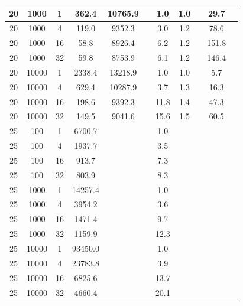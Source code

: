 \documentclass{juliacon}
\begin{document}
\begin{table}[!t]
{{\begin{tabular}{|c|c|c|c|c|c|c|c|c|c|c|}
    \hline
    20 & 1000 & 1 & 362.4 & 10765.9 &   & 1.0 & 1.0 &   & 29.7 &  \\
    \hline
    20 & 1000 & 4 & 119.0 & 9352.3 &   & 3.0 & 1.2 &   & 78.6 &  \\
    \hline
    20 & 1000 & 16 & 58.8 & 8926.4 &   & 6.2 & 1.2 &   & 151.8 &  \\
    \hline
    20 & 1000 & 32 & 59.8 & 8753.9 &   & 6.1 & 1.2 &   & 146.4 &  \\
    \hline
    20 & 10000 & 1 & 2338.4 & 13218.9 &   & 1.0 & 1.0 &   & 5.7 &  \\
    \hline
    20 & 10000 & 4 & 629.4 & 10287.9 &   & 3.7 & 1.3 &   & 16.3 &  \\
    \hline
    20 & 10000 & 16 & 198.6 & 9392.3 &   & 11.8 & 1.4 &   & 47.3 &  \\
    \hline
    20 & 10000 & 32 & 149.5 & 9041.6 &   & 15.6 & 1.5 &   & 60.5 &  \\
    \hline
    25 & 100 & 1 & 6700.7 &   &   & 1.0 &   &   &   &  \\
    \hline
    25 & 100 & 4 & 1937.7 &   &   & 3.5 &   &   &   &  \\
    \hline
    25 & 100 & 16 & 913.7 &   &   & 7.3 &   &   &   &  \\
    \hline
    25 & 100 & 32 & 803.9 &   &   & 8.3 &   &   &   &  \\
    \hline
    25 & 1000 & 1 & 14257.4 &   &   & 1.0 &   &   &   &  \\
    \hline
    25 & 1000 & 4 & 3954.2 &   &   & 3.6 &   &   &   &  \\
    \hline
    25 & 1000 & 16 & 1471.4 &   &   & 9.7 &   &   &   &  \\
    \hline
    25 & 1000 & 32 & 1159.9 &   &   & 12.3 &   &   &   &  \\
    \hline
    25 & 10000 & 1 & 93450.0 &   &   & 1.0 &   &   &   &  \\
    \hline
    25 & 10000 & 4 & 23783.8 &   &   & 3.9 &   &   &   &  \\
    \hline
    25 & 10000 & 16 & 6825.6 &   &   & 13.7 &   &   &   &  \\
    \hline
    25 & 10000 & 32 & 4660.4 &   &   & 20.1 &   &   &   &  \\
    \hline 
    \end{tabular}}}
\end{table}

\end{document}
